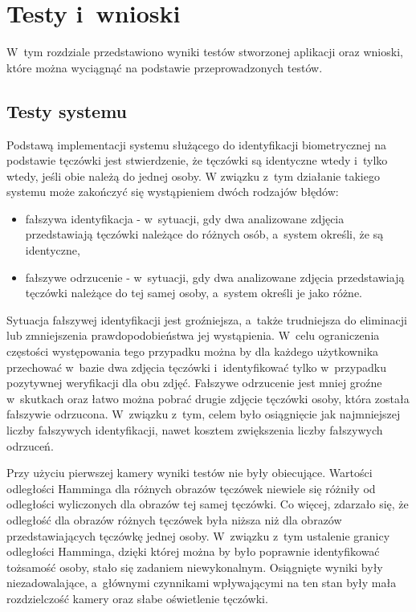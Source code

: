 \chapter{Testy i~wnioski}
\label{cha:testywnioski}
W~tym rozdziale przedstawiono wyniki testów stworzonej aplikacji oraz wnioski, które można wyciągnąć na podstawie przeprowadzonych testów.

\section{Testy systemu}
\label{sec:testy}
Podstawą implementacji systemu służącego do identyfikacji biometrycznej na podstawie tęczówki jest stwierdzenie, że tęczówki są identyczne wtedy i~tylko wtedy, jeśli obie należą do jednej osoby. W związku z~tym działanie takiego systemu może zakończyć się wystąpieniem dwóch rodzajów błędów:
\begin{itemize}
\item fałszywa identyfikacja - w~sytuacji, gdy dwa analizowane zdjęcia przedstawiają tęczówki należące do różnych osób, a~system określi, że są identyczne,
\item fałszywe odrzucenie - w~sytuacji, gdy dwa analizowane zdjęcia przedstawiają tęczówki należące do tej samej osoby, a~system określi je jako różne.
\end{itemize}
Sytuacja fałszywej identyfikacji jest groźniejsza, a~także trudniejsza do eliminacji lub zmniejszenia prawdopodobieństwa jej wystąpienia. W~celu ograniczenia częstości występowania tego przypadku można by dla każdego użytkownika przechować w~bazie dwa zdjęcia tęczówki i~identyfikować tylko w~przypadku pozytywnej weryfikacji dla obu zdjęć. Fałszywe odrzucenie jest mniej groźne w~skutkach oraz łatwo można pobrać drugie zdjęcie tęczówki osoby, która została fałszywie odrzucona. W~związku z~tym, celem było osiągnięcie jak najmniejszej liczby fałszywych identyfikacji, nawet kosztem zwiększenia liczby fałszywych odrzuceń.

Przy użyciu pierwszej kamery wyniki testów nie były obiecujące. Wartości odległości Hamminga dla różnych obrazów tęczówek niewiele się różniły od odległości wyliczonych dla obrazów tej samej tęczówki. Co więcej, zdarzało się, że odległość dla obrazów różnych tęczówek była niższa niż dla obrazów przedstawiających tęczówkę jednej osoby. W~związku z~tym ustalenie granicy odległości Hamminga, dzięki której można by było poprawnie identyfikować tożsamość osoby, stało się zadaniem niewykonalnym. Osiągnięte wyniki były niezadowalające, a~głównymi czynnikami wpływającymi na ten stan były mała rozdzielczość kamery oraz słabe oświetlenie tęczówki.

